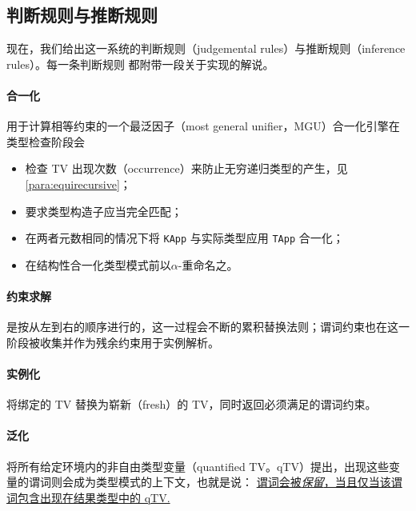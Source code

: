 \documentclass[a4paper, 11pt]{article}
\theoremstyle{remark}\newtheorem*{remark}{Remark}
\theoremstyle{definition}\newtheorem*{definition}{Definition}
\begin{document}
\subsection{判断规则与推断规则}

现在，我们给出这一系统的判断规则（judgemental rules）与推断规则（inference rules）。每一条判断规则
都附带一段关于实现的解说。

\paragraph{合一化} 用于计算相等约束的一个最泛因子（most general unifier，MGU）合一化引擎在类型检查阶段会
\begin{itemize}\itemsep0em
  \item 检查 TV 出现次数（occurrence）来防止无穷递归类型的产生，见 \autoref{para:equirecursive}；
  \item 要求类型构造子应当完全匹配；
  \item 在两者元数相同的情况下将 \texttt{KApp} 与实际类型应用 \texttt{TApp} 合一化；
  \item 在结构性合一化类型模式前以$\alpha$-重命名之。
\end{itemize}
\paragraph{约束求解} 是按从左到右的顺序进行的，这一过程会不断的累积替换法则；谓词约束也在这一阶段被收集并作为残余约束用于实例解析。
\paragraph{实例化} 将绑定的 TV 替换为崭新（fresh）的 TV，同时返回必须满足的谓词约束。
\paragraph{泛化} 将所有给定环境内的非自由类型变量（quantified TV。qTV）提出，出现这些变量的谓词则会成为类型模式的上下文，也就是说：
\underline{谓词会被\emph{保留}，当且仅当该谓词包含出现在结果类型中的 qTV. }
\end{document}
